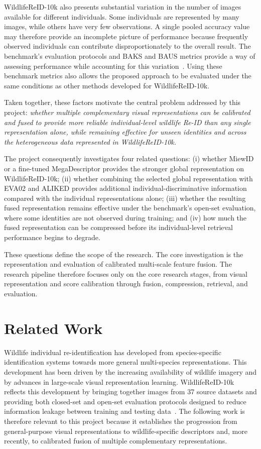 \documentclass[runningheads]{llncs}
\begin{document}
WildlifeReID-10k also presents substantial variation in the number of images
available for different individuals. Some individuals are represented by many
images, while others have very few observations. A single pooled accuracy
value may therefore provide an incomplete picture of performance because
frequently observed individuals can contribute disproportionately to the
overall result. The benchmark's evaluation protocols and BAKS and BAUS
metrics provide a way of assessing performance while accounting for this
variation~\cite{adam2025wildlifereid,mendes2017open}. Using these benchmark
metrics also allows the proposed approach to be evaluated under the same
conditions as other methods developed for WildlifeReID-10k.

Taken together, these factors motivate the central problem addressed by this
project: \emph{whether multiple complementary visual representations can be
calibrated and fused to provide more reliable individual-level wildlife
Re-ID than any single representation alone, while remaining effective for
unseen identities and across the heterogeneous data represented in
WildlifeReID-10k.}

The project consequently investigates four related questions: (i) whether
MiewID or a fine-tuned MegaDescriptor provides the stronger global
representation on WildlifeReID-10k; (ii) whether combining the selected
global representation with EVA02 and ALIKED provides additional
individual-discriminative information compared with the individual
representations alone; (iii) whether the resulting fused representation
remains effective under the benchmark's open-set evaluation, where some
identities are not observed during training; and (iv) how much the fused
representation can be compressed before its individual-level retrieval
performance begins to degrade.

These questions define the scope of the research. The core investigation is
the representation and evaluation of calibrated multi-scale feature fusion.
The research pipeline therefore focuses only on the core research stages,
from visual representation and score calibration through fusion, compression,
retrieval, and evaluation.

\section{Related Work}

Wildlife individual re-identification has developed from
species-specific identification systems towards more general
multi-species representations. This development has been driven by the
increasing availability of wildlife imagery and by advances in
large-scale visual representation learning. WildlifeReID-10k reflects this
development by bringing together images from 37 source datasets and providing
both closed-set and open-set evaluation protocols designed to reduce
information leakage between training and testing data~\cite{adam2025wildlifereid}.
The following work is therefore relevant to this project because it
establishes the progression from general-purpose visual representations to
wildlife-specific descriptors and, more recently, to calibrated fusion of
multiple complementary representations.
\end{document}
